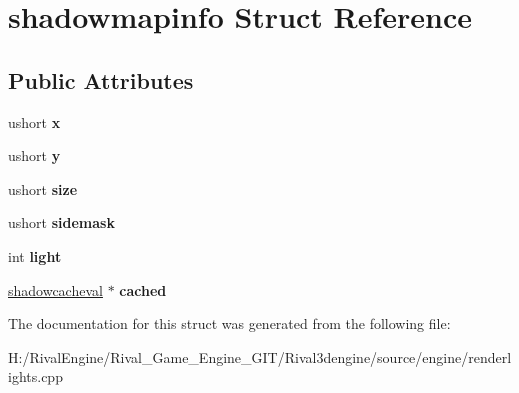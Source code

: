 \hypertarget{structshadowmapinfo}{}\section{shadowmapinfo Struct Reference}
\label{structshadowmapinfo}
\subsection*{Public Attributes}
\begin{DoxyCompactItemize}
\item 
\mbox{\label{structshadowmapinfo_a97d712b1c844e537bb3865d366f23752}} 
ushort {\bfseries x}
\item 
\mbox{\label{structshadowmapinfo_ae880b8f70c9bb36a265dd8df7844d383}} 
ushort {\bfseries y}
\item 
\mbox{\label{structshadowmapinfo_acf58e1c67de6e862c1ac3c1ffb894153}} 
ushort {\bfseries size}
\item 
\mbox{\label{structshadowmapinfo_abd65c0800fcc82a42f13003d842afdf1}} 
ushort {\bfseries sidemask}
\item 
\mbox{\label{structshadowmapinfo_a8181acae14b5825e659d030e10af156b}} 
int {\bfseries light}
\item 
\mbox{\label{structshadowmapinfo_a4bc780505c80f083f021d3ab08e9234b}} 
\hyperlink{structshadowcacheval}{shadowcacheval} $\ast$ {\bfseries cached}
\end{DoxyCompactItemize}


The documentation for this struct was generated from the following file\+:\begin{DoxyCompactItemize}
\item 
H\+:/\+Rival\+Engine/\+Rival\+\_\+\+Game\+\_\+\+Engine\+\_\+\+G\+I\+T/\+Rival3dengine/source/engine/renderlights.\+cpp\end{DoxyCompactItemize}
